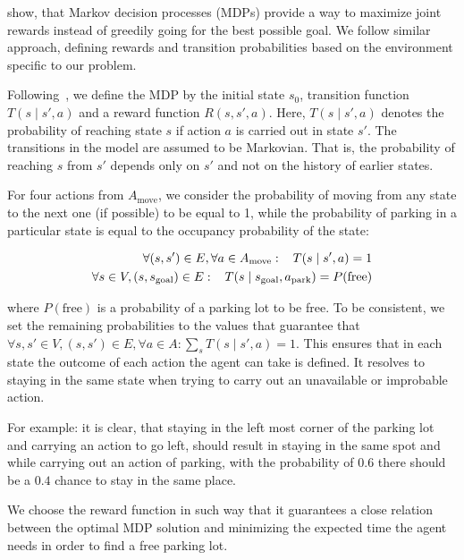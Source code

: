 \citet{tipaldiICRA11} show, that Markov decision processes (MDPs) provide a
way to maximize joint rewards instead of greedily going for the best possible
goal. We follow similar approach, defining rewards and transition
probabilities based on the environment specific to our problem.

Following~\citet{bellman1957}, we define the MDP by the initial state $s_0$,
transition function $T(s \mid s', a)$ and a reward function $R(s, s', a)$.
Here, $T(s \mid s', a)$ denotes the probability of reaching state $s$ if
action $a$ is carried out in state $s'$. The transitions in the model are
assumed to be Markovian. That is, the probability of reaching $s$ from $s'$
depends only on $s'$ and not on the history of earlier states.

For four actions from $A_\mathrm{move}$, we consider the probability of moving
from any state to the next one (if possible) to be equal to 1, while the
probability of parking in a particular state is equal to the occupancy
probability of the state:

\begin{eqnarray}
\forall (s, s') \in E, \forall a \in A_{\mathrm{move}} : \hspace{3mm} T(s \mid s', a) = 1 \\
\forall s \in V, (s,s_{\mathrm{goal}}) \in E : \hspace{3mm} T(s \mid s_{\mathrm{goal}}, a_{\mathrm{park}}) = P(\mathrm{free})
\end{eqnarray}

where $P(\mathrm{free})$ is a probability of a parking lot to be free. To be
consistent, we set the remaining probabilities to the values that guarantee
that $\forall s, s' \in V, (s, s') \in E, \forall a \in A: \sum_{s}T(s \mid
s', a) = 1$. This ensures that in each state the outcome of each action the
agent can take is defined. It resolves to staying in the same state when
trying to carry out an unavailable or improbable action.

For example: it is clear, that staying in the left most corner of the parking
lot and carrying an action to go left, should result in staying in the same
spot and while carrying out an action of parking, with the probability of
$0.6$ there should be a $0.4$ chance to stay in the same place.

We choose the reward function in such way that it guarantees a close relation
between the optimal MDP solution and minimizing the expected time the agent
needs in order to find a free parking lot.

